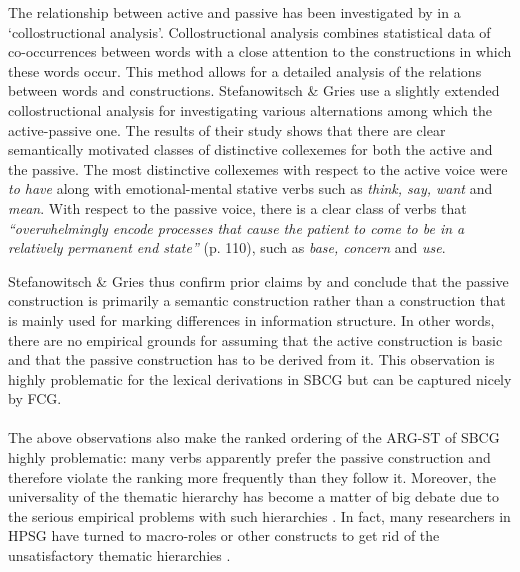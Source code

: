 The relationship between active and passive has been investigated by \citet{stefanowitsch03collostructions} in a `collostructional analysis'. Collostructional analysis combines statistical data of co-occurrences between words with a close attention to the constructions in which these words occur. This method allows for a detailed analysis of the relations between words and constructions. Stefanowitsch \& Gries use a slightly extended collostructional analysis for investigating various alternations among which the active-passive one. The results of their study shows that there are clear semantically motivated classes of distinctive collexemes for both the active and the passive. The most distinctive collexemes with respect to the active voice were {\em to have} along with emotional-mental stative verbs such as {\em think, say, want} and {\em mean}. With respect to the passive voice, there is a clear class of verbs that {\em ``overwhelmingly encode processes that cause the patient to come to be in a relatively permanent end state''} (p. 110), such as {\em base, concern} and {\em use}.

Stefanowitsch \& Gries thus confirm prior claims by \citet{pinker89learnability} and conclude that the passive construction is primarily a semantic construction rather than a construction that is mainly used for marking differences in information structure. In other words, there are no empirical grounds for assuming that the active construction is basic and that the passive construction has to be derived from it. This observation is highly problematic for the lexical derivations in SBCG but can be captured nicely by FCG.
\\
\\
 The above observations also make the ranked ordering of the ARG-ST of SBCG highly problematic: many verbs apparently prefer the passive construction and therefore violate the ranking more frequently than they follow it. Moreover, the universality of the thematic hierarchy has become a matter of big debate due to the serious empirical problems with such hierarchies \citep{levin05argument}. In fact, many researchers in HPSG have turned to macro-roles or other constructs to get rid of the unsatisfactory thematic hierarchies \citep{davis00linking}.

